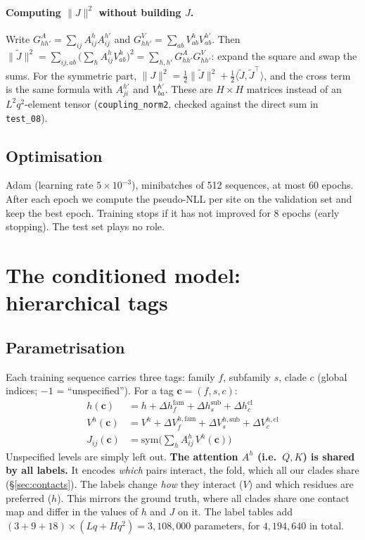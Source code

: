 \paragraph{Computing $\|J\|^2$ without building $J$.} Write $G^A_{hh'}=\sum_{ij}A^h_{ij}A^{h'}_{ij}$ and
$G^V_{hh'}=\sum_{ab}V^h_{ab}V^{h'}_{ab}$. Then
$\|\tilde J\|^2=\sum_{ij,ab}\big(\sum_hA^h_{ij}V^h_{ab}\big)^2=\sum_{h,h'}G^A_{hh'}G^V_{hh'}$: expand the square
and swap the sums. For the symmetric part,
$\|J\|^2=\frac12\|\tilde J\|^2+\frac12\langle\tilde J,\tilde J^{\top}\rangle$, and the cross term is the same
formula with $A^{h'}_{ji}$ and $V^{h'}_{ba}$. These are $H\times H$ matrices instead of an
$L^2q^2$-element tensor (\texttt{coupling\_norm2}, checked against the direct sum in \texttt{test\_08}).

\subsection{Optimisation}
Adam (learning rate $5\times10^{-3}$), minibatches of 512 sequences, at most 60 epochs. After each epoch
we compute the pseudo-NLL per site on the validation set and keep the best epoch. Training stops if it has
not improved for 8 epochs (early stopping). The test set plays no role.

\section{The conditioned model: hierarchical tags}\label{sec:cond}
\subsection{Parametrisation}
Each training sequence carries three tags: family $f$, subfamily $s$, clade $c$ (global indices; $-1$ =
``unspecified''). For a tag $\bm c=(f,s,c)$:
\begin{equation}\label{eq:condparams}
\boxed{\begin{aligned}
h(\bm c)&=h+\Delta h^{\text{fam}}_f+\Delta h^{\text{sub}}_s+\Delta h^{\text{cl}}_c\\
V^h(\bm c)&=V^h+\Delta V^{h,\text{fam}}_f+\Delta V^{h,\text{sub}}_s+\Delta V^{h,\text{cl}}_c\\
J_{ij}(\bm c)&=\mathrm{sym}\Big(\textstyle\sum_hA^h_{ij}\,V^h(\bm c)\Big)
\end{aligned}}
\end{equation}
Unspecified levels are simply left out. \textbf{The attention $A^h$ (i.e.\ $Q,K$) is shared by all labels.}
It encodes \emph{which} pairs interact, the fold, which all our clades share (\S\ref{sec:contacts}). The labels
change \emph{how} they interact ($V$) and which residues are preferred ($h$). This mirrors the ground truth,
where all clades share one contact map and differ in the values of $h$ and $J$ on it. The label tables add
$(3+9+18)\times(Lq+Hq^2)=3{,}108{,}000$ parameters, for $4{,}194{,}640$ in total.

